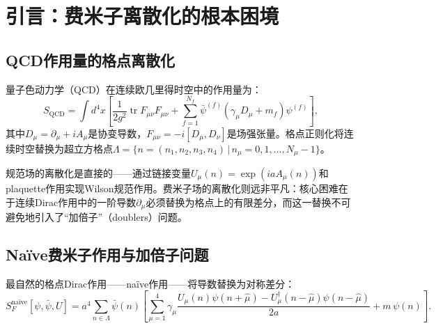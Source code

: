 \documentclass[12pt,a4paper]{ctexart}
\theoremstyle{definition}
\begin{document}
\begin{abstract}
\textbf{Overlap费米子}——作为Ginsparg--Wilson关系的精确解，由Neuberger给出：$D_{\text{ov}} = \frac{1}{a}[1 - \gamma_5\,\text{sign}(\gamma_5 D_W)]$。精确保持格点手征对称性，具有正确的指标定理和零模结构，无加倍子。主要限制是计算成本极高（涉及矩阵符号函数）。

本文以比较表格和统一的理论框架贯穿始终，并通过Nielsen--Ninomiya定理、Ginsparg--Wilson关系、Symanzik改进和tadpole改进四条理论线索将六种方案编织成一个有机整体。最后讨论了各方案中手征对称性处理对部分子物理（PDF、TMD-PDF）格点计算的深远影响。
\end{abstract}

\tableofcontents
\newpage

\section{引言：费米子离散化的根本困境}

\subsection{QCD作用量的格点离散化}

量子色动力学（QCD）在连续欧几里得时空中的作用量为：
\begin{equation}
S_{\text{QCD}} = \int d^4x \left[ \frac{1}{2g^2}\operatorname{tr} F_{\mu\nu}F_{\mu\nu} + \sum_{f=1}^{N_f} \bar\psi^{(f)}(\gamma_\mu D_\mu + m_f)\psi^{(f)} \right],
\label{eq:QCD_continuum}
\end{equation}
其中$D_\mu = \partial_\mu + iA_\mu$是协变导数，$F_{\mu\nu} = -i[D_\mu, D_\nu]$是场强张量。格点正则化将连续时空替换为超立方格点$\Lambda = \{n = (n_1,n_2,n_3,n_4) \,|\, n_\mu = 0,1,\dots,N_\mu-1\}$。

规范场的离散化是直接的——通过链接变量$U_\mu(n) = \exp(i a A_\mu(n))$和plaquette作用实现Wilson规范作用。费米子场的离散化则远非平凡：核心困难在于连续Dirac作用中的一阶导数$\partial_\mu$必须替换为格点上的有限差分，而这一替换不可避免地引入了``加倍子''（doublers）问题。

\subsection{Na\"ive费米子作用与加倍子问题}

最自然的格点Dirac作用——na\"ive作用——将导数替换为对称差分：
\begin{equation}
S_F^{\text{na\"ive}}[\psi,\bar\psi,U] = a^4\sum_{n\in\Lambda} \bar\psi(n) \left[ \sum_{\mu=1}^4 \gamma_\mu \frac{U_\mu(n)\psi(n+\hat\mu) - U_\mu^\dagger(n-\hat\mu)\psi(n-\hat\mu)}{2a} + m\,\psi(n) \right].
\label{eq:naive_action}
\end{equation}
\end{document}
